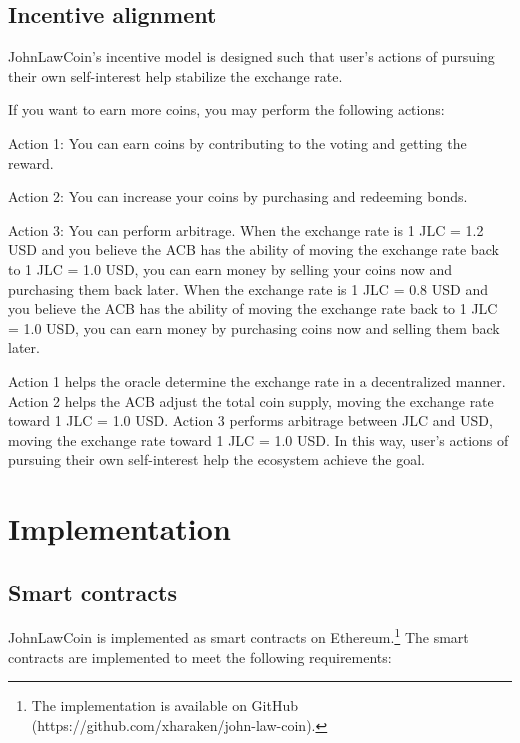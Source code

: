 \documentclass[dvipdfmx,a4paper]{article}
\begin{document}
\subsection{Incentive alignment}

JohnLawCoin's incentive model is designed such that user's actions of pursuing their own self-interest help stabilize the exchange rate.

If you want to earn more coins, you may perform the following actions:

\begin{description}
\item{Action 1}: You can earn coins by contributing to the voting and getting the reward.
\item{Action 2}: You can increase your coins by purchasing and redeeming bonds.
\item{Action 3}: You can perform arbitrage. When the exchange rate is 1 JLC = 1.2 USD and you believe the ACB has the ability of moving the exchange rate back to 1 JLC = 1.0 USD, you can earn money by selling your coins now and purchasing them back later. When the exchange rate is 1 JLC = 0.8 USD and you believe the ACB has the ability of moving the exchange rate back to 1 JLC = 1.0 USD, you can earn money by purchasing coins now and selling them back later.
\end{description}

Action 1 helps the oracle determine the exchange rate in a decentralized manner. Action 2 helps the ACB adjust the total coin supply, moving the exchange rate toward 1 JLC = 1.0 USD. Action 3 performs arbitrage between JLC and USD, moving the exchange rate toward 1 JLC = 1.0 USD. In this way, user's actions of pursuing their own self-interest help the ecosystem achieve the goal.

\section{Implementation}

\subsection{Smart contracts}

JohnLawCoin is implemented as smart contracts on Ethereum.\footnote{The implementation is available on GitHub (https://github.com/xharaken/john-law-coin).} The smart contracts are implemented to meet the following requirements:
\end{document}
